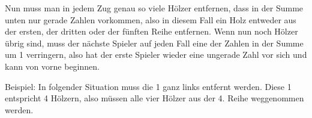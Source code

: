 \documentclass{zusammenfassung}
\begin{document}
Nun muss man in jedem Zug genau so viele Hölzer entfernen, dass in der Summe unten nur gerade Zahlen vorkommen, also in diesem
Fall ein Holz entweder aus der ersten, der dritten oder der fünften Reihe entfernen. Wenn nun noch Hölzer übrig sind, muss der
nächste Spieler auf jeden Fall eine der Zahlen in der Summe um 1 verringern, also hat der erste Spieler wieder eine ungerade Zahl
vor sich und kann von vorne beginnen.

Beispiel: In folgender Situation muss die 1 ganz links entfernt werden. Diese 1 entspricht 4 Hölzern, also müssen alle vier Hölzer
aus der 4. Reihe weggenommen werden.

\begin{center}
\end{center}
\end{document}
